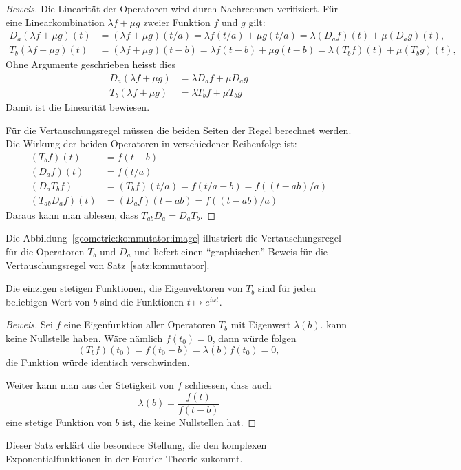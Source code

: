 \begin{proof}[Beweis]
Die Linearität der Operatoren wird durch Nachrechnen verifiziert.
Für eine Linearkombination $\lambda f+\mu g$ zweier Funktion $f$ und $g$ gilt:
\begin{align*}
D_a(\lambda f+\mu g)(t)
&=
(\lambda f+\mu g)(t/a)
=
\lambda f(t/a)+\mu g(t/a)
=
\lambda (D_af)(t)+\mu (D_ag)(t),
\\
T_b(\lambda f+ \mu g)(t)
&=
(\lambda f+\mu g)(t-b)
=
\lambda f(t-b)+\mu g(t-b)
=
\lambda (T_bf)(t)+\mu (T_bg)(t),
\end{align*}
Ohne Argumente geschrieben heisst dies
\begin{align*}
D_a(\lambda f+\mu g) &= \lambda D_af + \mu D_ag
\\
T_b(\lambda f+\mu g) &= \lambda T_bf + \mu T_bg
\end{align*}
Damit ist die Linearität bewiesen.

Für die Vertauschungsregel müssen die beiden Seiten der Regel
berechnet werden.
Die Wirkung der beiden Operatoren in verschiedener Reihenfolge
ist:
\begin{align*}
(T_bf)(t)
&=
f(t-b)
\\
(D_af)(t)
&=
f(t/a)
\\
(D_aT_bf)
&=
(T_bf)(t/a)
=
f(t/a-b)
=
f((t-ab)/a)
\\
(T_{ab}D_a f)(t)
&=
(D_af)(t - ab)
=
f((t-ab)/a)
\end{align*}
Daraus kann man ablesen, dass $T_{ab}D_a=D_aT_b$.
\end{proof}

Die Abbildung~\ref{geometrie:kommutator:image} illustriert die
Vertauschungsregel für die Operatoren $T_b$ und $D_a$ und liefert
einen ``graphischen'' Beweis für die Vertauschungsregel von
Satz~\ref{satz:kommutator}.

\begin{satz}
Die einzigen stetigen Funktionen, die Eigenvektoren von $T_b$ sind für
jeden beliebigen Wert von $b$ sind die Funktionen $t\mapsto e^{i\omega t}$.
\end{satz}

\begin{proof}[Beweis]
Sei $f$ eine Eigenfunktion aller Operatoren $T_b$ mit Eigenwert $\lambda(b)$.
 kann keine Nullstelle haben.
Wäre nämlich $f(t_0)=0$, dann würde folgen
\[
(T_bf)(t_0) = f(t_0-b) = \lambda(b) f(t_0) = 0,
\]
die Funktion würde identisch verschwinden.

Weiter kann man aus der Stetigkeit von $f$ schliessen, dass auch
\[
\lambda(b) = \frac{f(t)}{f(t-b)}
\]
eine stetige Funktion von $b$ ist, die keine Nullstellen hat.
\end{proof}

Dieser Satz erklärt die besondere Stellung, die den komplexen
Exponentialfunktionen in der Fourier-Theorie zukommt.
